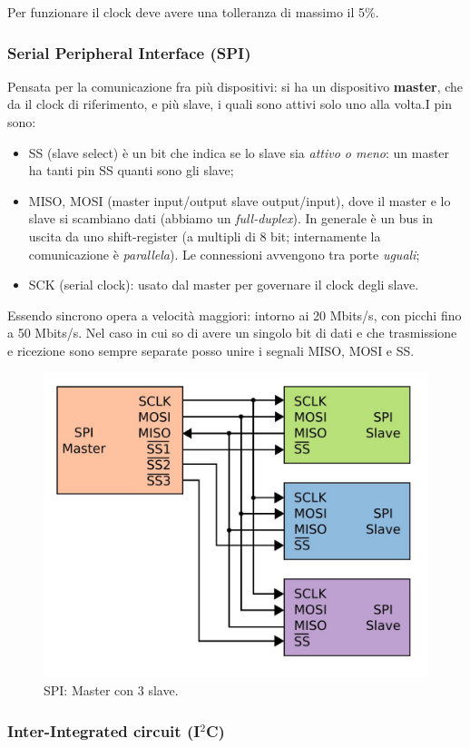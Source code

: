 \documentclass[
]{book}
\providecommand{\tightlist}{%
  \setlength{\itemsep}{0pt}\setlength{\parskip}{0pt}}
\begin{document}
Per funzionare il clock deve avere una tolleranza di massimo il 5\%.

\subsubsection{Serial Peripheral Interface
(SPI)}\label{serial-peripheral-interface-spi}

Pensata per la comunicazione fra più dispositivi: si ha un dispositivo
\textbf{master}, che da il clock di riferimento, e più slave, i quali
sono attivi solo uno alla volta.\newline I pin sono:

\begin{itemize}
\tightlist
\item
  SS (slave select) è un bit che indica se lo slave sia \emph{attivo o
  meno}: un master ha tanti pin SS quanti sono gli slave;
\item
  MISO, MOSI (master input/output slave output/input), dove il master e
  lo slave si scambiano dati (abbiamo un \emph{full-duplex}). In
  generale è un bus in uscita da uno shift-register (a multipli di 8
  bit; internamente la comunicazione è \emph{parallela}). Le connessioni
  avvengono tra porte \emph{uguali};
\item
  SCK (serial clock): usato dal master per governare il clock degli
  slave.
\end{itemize}

Essendo sincrono opera a velocità maggiori: intorno ai 20 Mbits/s, con
picchi fino a 50 Mbits/s. Nel caso in cui so di avere un singolo bit di
dati e che trasmissione e ricezione sono sempre separate posso unire i
segnali MISO, MOSI e SS.

\begin{figure}
\centering
\includegraphics[width=0.3\linewidth,height=\textheight,keepaspectratio]{assets/imgs/spi.jpg}
\caption{SPI: Master con 3 slave.}
\end{figure}

\subsubsection{\texorpdfstring{Inter-Integrated circuit
(I\(^2\)C)}{Inter-Integrated circuit (I\^{}2C)}}\label{inter-integrated-circuit-i2c}
\end{document}
